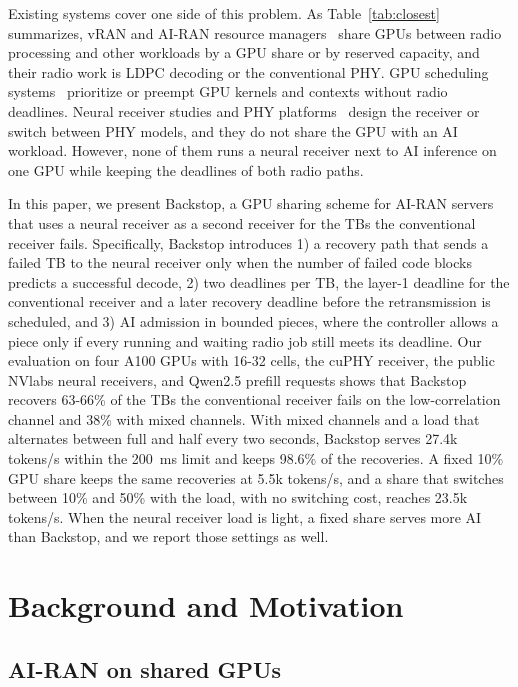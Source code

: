 \documentclass[acmsmall,screen,review,anonymous]{acmart}
\newcommand{\sys}{Backstop\xspace}
\begin{document}
Existing systems cover one side of this problem. As Table~\ref{tab:closest} summarizes, vRAN and AI-RAN
resource managers~\cite{yinyangran,cloudric,concordia,interplay,caora,haf,distributedairan} share GPUs
between radio processing and other workloads by a GPU share or by reserved capacity, and their radio work is
LDPC decoding or the conventional PHY. GPU scheduling systems~\cite{daris,reef,xsched,nvtaskset} prioritize
or preempt GPU kernels and contexts without radio deadlines. Neural receiver studies and PHY
platforms~\cite{deeprx,nrx5g,nrxrt,arches,ocudu} design the receiver or switch between PHY models, and they
do not share the GPU with an AI workload. However, none of them runs a neural receiver next to AI inference
on one GPU while keeping the deadlines of both radio paths.

In this paper, we present \sys, a GPU sharing scheme for AI-RAN servers that uses a neural receiver as a
second receiver for the TBs the conventional receiver fails. Specifically, \sys introduces 1) a recovery
path that sends a failed TB to the neural receiver only when the number of failed code blocks predicts a
successful decode, 2) two deadlines per TB, the layer-1 deadline for the conventional receiver and a later
recovery deadline before the retransmission is scheduled, and 3) AI admission in bounded pieces, where the
controller allows a piece only if every running and waiting radio job still meets its deadline. Our
evaluation on four A100 GPUs with 16-32 cells, the cuPHY receiver, the public NVlabs neural receivers, and
Qwen2.5 prefill requests shows that \sys recovers 63-66\% of the TBs the conventional receiver fails on the
low-correlation channel and 38\% with mixed channels. With
mixed channels and a load that alternates between full and half every two seconds, \sys serves 27.4k
tokens/s within the 200~ms limit and keeps 98.6\% of the recoveries. A fixed 10\% GPU share keeps the same
recoveries at 5.5k tokens/s, and a share that switches between 10\% and 50\% with the load, with no
switching cost, reaches 23.5k tokens/s. When the neural receiver load is light, a fixed share serves more AI
than \sys, and we report those settings as well.

\section{Background and Motivation}

\subsection{AI-RAN on shared GPUs}
\end{document}

